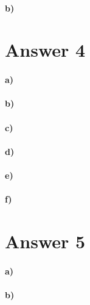 \documentclass[12pt]{article}
\newcommand\+{\mkern2mu}
\begin{document}
\paragraph{b)}

\section*{Answer 4}
\paragraph{a)} %
\paragraph{b)} %
\paragraph{c)}
\paragraph{d)}
\paragraph{e)}
\paragraph{f)}

\section*{Answer 5}
\paragraph{a)}
\paragraph{b)}
\end{document}
